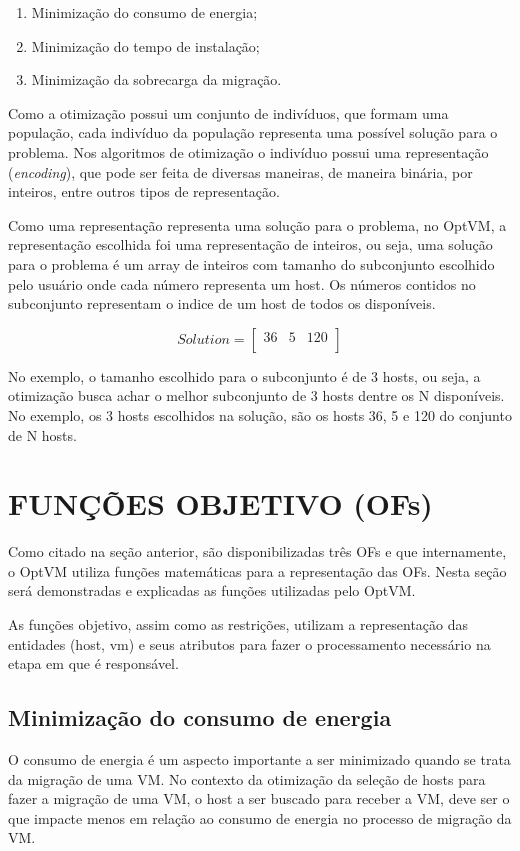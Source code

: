 \begin{enumerate}
\item Minimização do consumo de energia;
\item Minimização do tempo de instalação;
\item Minimização da sobrecarga da migração.
\end{enumerate}

Como a otimização possui um conjunto de indivíduos, que formam uma população, cada indivíduo
da população representa uma possível solução para o problema.  Nos algoritmos de 
otimização o indivíduo possui uma representação (\textit{encoding}), que pode ser feita
de diversas maneiras, de maneira binária, por inteiros, entre outros tipos de representação.

Como uma representação representa uma solução para o problema, no OptVM, a 
representação escolhida foi uma representação de inteiros, ou seja, uma solução
para o problema é um array de inteiros com tamanho do subconjunto escolhido pelo
usuário onde cada número representa um host. Os números contidos no subconjunto
representam o indice de um host de todos os disponíveis.

\[
  Solution=
  \left[{\begin{array}{cccccc}
    36 & 5 & 120 \\
  \end{array}}\right
  ]
\]

No exemplo, o tamanho escolhido para o subconjunto é de 3 hosts, ou seja, 
a otimização busca achar o melhor subconjunto de 3 hosts dentre os N disponíveis. 
No exemplo, os 3 hosts escolhidos na solução, são os hosts 36, 5 e 120 do conjunto de N hosts.

\section{FUNÇÕES OBJETIVO (OFs)}
Como citado na seção anterior, são disponibilizadas três OFs e que internamente, o OptVM
utiliza funções matemáticas para a representação das OFs. Nesta seção será demonstradas e
explicadas as funções utilizadas pelo OptVM.

As funções objetivo, assim como as restrições, utilizam a representação das entidades 
(host, vm) e seus atributos para fazer o processamento necessário na etapa em que é responsável.

\subsection{Minimização do consumo de energia}
O consumo de energia é um aspecto importante a ser minimizado quando
se trata da migração de uma VM. No contexto da otimização da seleção 
de hosts para fazer a migração de uma VM, o host a ser buscado
para receber a VM, deve ser o que impacte menos em relação ao consumo de 
energia no processo de migração da VM.

